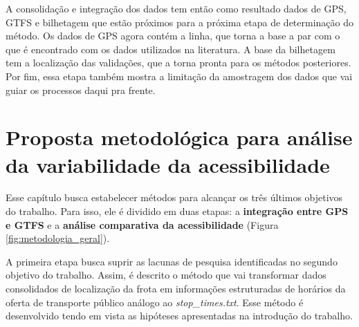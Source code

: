 \documentclass[        
    a4paper,          %
    12pt,             %
    chapter=TITLE,    %
    section=Title,    %
    subsection=Title, %
    oneside,          %
    english,          %
    spanish,          %
    brazil,           %
    fleqn             %
]{abntex2}
\begin{document}
  A consolidação e integração dos dados tem então como resultado dados de GPS, GTFS e bilhetagem que estão próximos para a próxima etapa de determinação do método. Os dados de GPS agora contém a linha, que torna a base a par com o que é encontrado com os dados utilizados na literatura. A base da bilhetagem tem a localização das validações, que a torna pronta para os métodos posteriores. Por fim, essa etapa também mostra a limitação da amostragem dos dados que vai guiar os processos daqui pra frente.
  
  \hypertarget{proposta-metodologica-para-analise-da-variabilidade-da-acessibilidade}{%
  \chapter{Proposta metodológica para análise da variabilidade da acessibilidade}\label{proposta-metodologica-para-analise-da-variabilidade-da-acessibilidade}}
  
  Esse capítulo busca estabelecer métodos para alcançar os três últimos objetivos do trabalho. Para isso, ele é dividido em duas etapas: a \textbf{integração entre GPS e GTFS} e a \textbf{análise comparativa da acessibilidade} (Figura \ref{fig:metodologia_geral}).
  
  \begin{figure}[!h]
  \captionsetup{width=16cm}
  \centering
  \end{figure}
  
  A primeira etapa busca suprir as lacunas de pesquisa identificadas no segundo objetivo do trabalho. Assim, é descrito o método que vai transformar dados consolidados de localização da frota em informações estruturadas de horários da oferta de transporte público análogo ao \emph{stop\_times.txt}. Esse método é desenvolvido tendo em vista as hipóteses apresentadas na introdução do trabalho.
  
\end{document}
